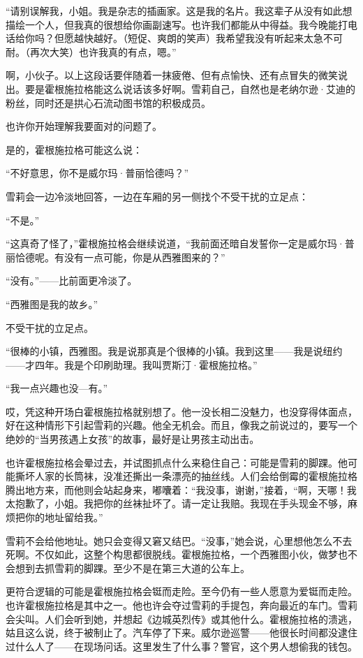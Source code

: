 “请别误解我，小姐。我是杂志的插画家。这是我的名片。我这辈子从没有如此想描绘一个人，但我真的很想给你画副速写。也许我们都能从中得益。我今晚能打电话给你吗？但愿越快越好。（短促、爽朗的笑声）我希望我没有听起来太急不可耐。（再次大笑）也许我真的有点，嗯。”

啊，小伙子。以上这段话要伴随着一抹疲倦、但有点愉快、还有点冒失的微笑说出。要是霍根施拉格能这么说话该多好啊。雪莉自己，自然也是老纳尔逊·艾迪的粉丝，同时还是拱心石流动图书馆的积极成员。

也许你开始理解我要面对的问题了。

是的，霍根施拉格可能这么说：

“不好意思，你不是威尔玛·普丽恰德吗？”

雪莉会一边冷淡地回答，一边在车厢的另一侧找个不受干扰的立足点：

“不是。”

“这真奇了怪了，”霍根施拉格会继续说道，“我前面还暗自发誓你一定是威尔玛·普丽恰德呢。有没有一点可能，你是从西雅图来的？”

“没有。”——比前面更冷淡了。

“西雅图是我的故乡。”

不受干扰的立足点。

“很棒的小镇，西雅图。我是说那真是个很棒的小镇。我到这里——我是说纽约——才四年。我是个印刷助理。我叫贾斯汀·霍根施拉格。”

“我一点兴趣也没—有。”

哎，凭这种开场白霍根施拉格就别想了。他一没长相二没魅力，也没穿得体面点，好在这种情形下引起雪莉的兴趣。他全无机会。而且，像我之前说过的，要写一个绝妙的“当男孩遇上女孩”的故事，最好是让男孩主动出击。

也许霍根施拉格会晕过去，并试图抓点什么来稳住自己：可能是雪莉的脚踝。他可能撕坏人家的长筒袜，没准还撕出一条漂亮的抽丝线。人们会给倒霉的霍根施拉格腾出地方来，而他则会站起身来，嘟囔着：“我没事，谢谢，”接着，“啊，天哪！我太抱歉了，小姐。我把你的丝袜扯坏了。请一定让我赔。我现在手头现金不够，麻烦把你的地址留给我。”

雪莉不会给他地址。她只会变得又窘又结巴。“没事，”她会说，心里想他怎么不去死啊。不仅如此，这整个构思都很脱线。霍根施拉格，一个西雅图小伙，做梦也不会想到去抓雪莉的脚踝。至少不是在第三大道的公车上。

更符合逻辑的可能是霍根施拉格会铤而走险。至今仍有一些人愿意为爱铤而走险。也许霍根施拉格是其中之一。他也许会夺过雪莉的手提包，奔向最近的车门。雪莉会尖叫。人们会听到她，并想起《边城英烈传》或其他什么。霍根施拉格的溃逃，姑且这么说，终于被制止了。汽车停了下来。威尔逊巡警——他很长时间都没逮住过什么人了——在现场问话。这里发生了什么事？警官，这个男人想偷我的钱包。


